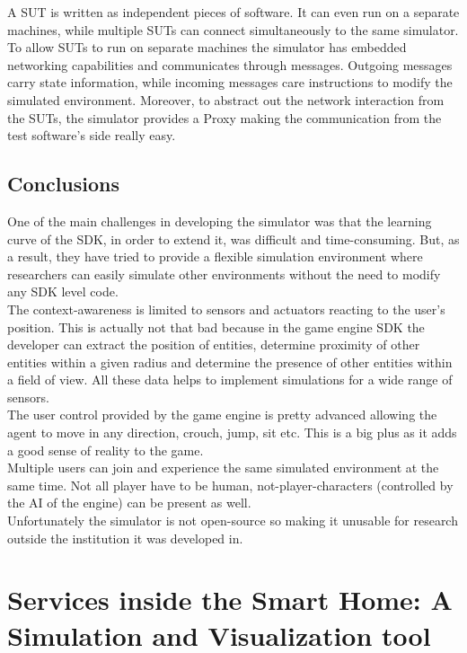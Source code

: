 A SUT is written as independent pieces of software. It can even run on a separate machines, while multiple SUTs can connect simultaneously to the same simulator. To allow SUTs to run on separate machines the simulator has embedded networking capabilities and communicates through messages. Outgoing messages carry state information, while incoming messages care instructions to modify the simulated environment. Moreover, to abstract out the network interaction from the SUTs, the simulator provides a Proxy making the communication from the test software's side really easy.\\

\subsection{Conclusions}

One of the main challenges in developing the simulator was that the learning curve of the SDK, in order to extend it, was difficult and time-consuming. But, as a result, they have tried to provide a flexible simulation environment where researchers can easily simulate other environments without the need to modify any SDK level code.\\

The context-awareness is limited to sensors and actuators reacting to the user's position. This is actually not that bad because in the game engine SDK the developer can extract the position of entities, determine proximity of other entities within a given radius and determine the presence of other entities within a field of view. All these data helps to implement simulations for a wide range of sensors.\\

The user control provided by the game engine is pretty advanced allowing the agent to move in any direction, crouch, jump, sit etc. This is a big plus as it adds a good sense of reality to the game.\\

Multiple users can join and experience the same simulated environment at the same time. Not all player have to be human, not-player-characters (controlled by the AI of the engine) can be present as well.\\

Unfortunately the simulator is not open-source so making it unusable for research outside the institution it was developed in.

\section{Services inside the Smart Home: A Simulation and Visualization tool}\label{sec:services_in_smart_homes}


